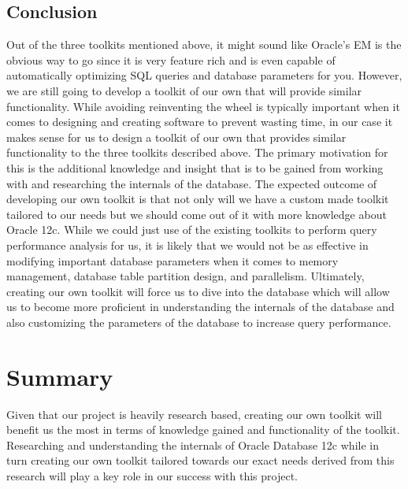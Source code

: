 \documentclass[draftclsnofoot, onecolumn, compsoc, 10pt]{IEEEtran}
\begin{document}
\subsection{Conclusion}
Out of the three toolkits mentioned above, it might sound like Oracle’s EM is the obvious way to go since it is very feature rich and is even capable of automatically optimizing SQL queries and database parameters for you. 
However, we are still going to develop a toolkit of our own that will provide similar functionality. 
While avoiding reinventing the wheel is typically important when it comes to designing and creating software to prevent wasting time, in our case it makes sense for us to design a toolkit of our own that provides similar functionality to the three toolkits described above. 
The primary motivation for this is the additional knowledge and insight that is to be gained from working with and researching the internals of the database.
The expected outcome of developing our own toolkit is that not only will we have a custom made toolkit tailored to our needs but we should come out of it with more knowledge about Oracle 12c. 
While we could just use of the existing toolkits to perform query performance analysis for us, it is likely that we would not be as effective in modifying important database parameters when it comes to memory management, database table partition design, and parallelism. 
Ultimately, creating our own toolkit will force us to dive into the database which will allow us to become more proficient in understanding the internals of the database and also customizing the parameters of the database to increase query performance.

\section{Summary}


Given that our project is heavily research based, creating our own toolkit will benefit us the most in terms of knowledge gained and functionality of the toolkit. Researching and understanding the internals of Oracle Database 12c while in turn creating our own toolkit tailored towards our exact needs derived from this research will play a key role in our success with this project.

\end{document}
